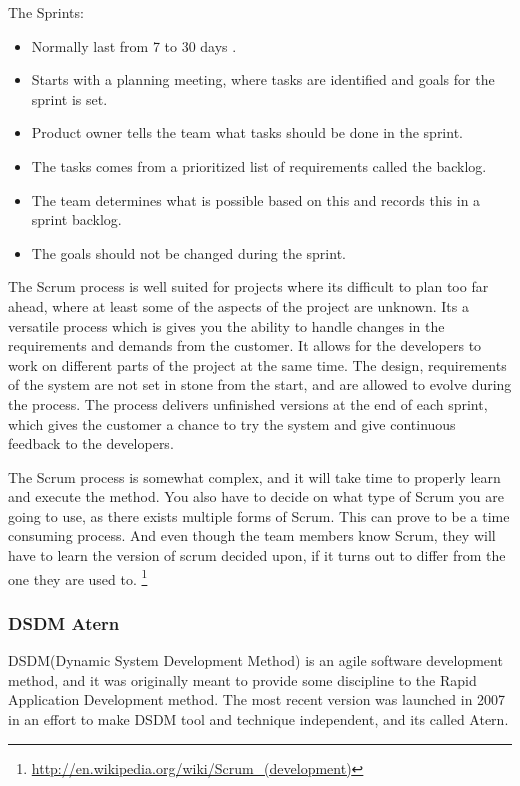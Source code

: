 The Sprints:
\begin{itemize}

\item Normally last from 7 to 30 days .
\item Starts with a planning meeting, where tasks are identified and goals for the sprint is set.
\item Product owner tells the team what tasks should be done in the sprint.
\item The tasks comes from a prioritized list of requirements called the backlog.
\item The team determines what is possible based on this and records this in a sprint backlog.
\item The goals should not be changed during the sprint.

\end{itemize}

The Scrum process is well suited for projects where its difficult to plan too far ahead, where at least some of the aspects of the project are unknown. Its a versatile process which is gives you the ability to handle changes in the requirements and demands from the customer. It allows for the developers to work on different parts of the project at the same time. The design, requirements of the system are not set in stone from the start, and are allowed to evolve during the process. The process delivers unfinished versions at the end of each sprint, which gives the customer a chance to try the system and give continuous feedback to the developers.

The Scrum process is somewhat complex, and it will take time to properly learn and execute the method. You also have to decide on what type of Scrum you are going to use, as there exists multiple forms of Scrum. This can prove to be a time consuming process. And even though the team members know Scrum, they will have to learn the version of scrum decided upon, if it turns out to differ from the one they are used to.
\footnote{\url{http://en.wikipedia.org/wiki/Scrum_(development)}}

\subsubsection{DSDM Atern}
DSDM(Dynamic System Development Method) is an agile software development method, and it was originally meant to provide some discipline to the Rapid Application Development method. The most recent version was launched in 2007 in an effort to make DSDM tool and technique independent, and its called Atern. 


